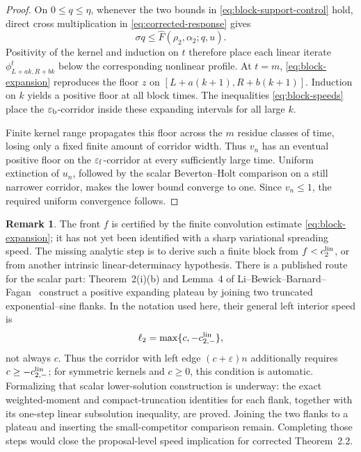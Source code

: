 \documentclass[11pt]{article}
\theoremstyle{definition}
\newtheorem{remark}[theorem]{Remark}
\newcommand{\Fhat}{\widehat F}
\begin{document}
\begin{proof}
On \(0\leq q\leq\eta\), whenever the two bounds in
\eqref{eq:block-support-control} hold, direct cross multiplication in
\eqref{eq:corrected-response} gives
\[
  \sigma q\leq\Fhat(\rho_2,\alpha_2;q,u).
\]
Positivity of the kernel and induction on \(t\) therefore place each linear
iterate \(\phi_{L+ak,R+bk}^{t}\) below the corresponding nonlinear profile.
At \(t=m\), \eqref{eq:block-expansion} reproduces the floor \(z\) on
\([L+a(k+1),R+b(k+1)]\).  Induction on \(k\) yields a positive floor at all
block times.  The inequalities \eqref{eq:block-speeds} place the
\(\varepsilon_{\rm b}\)-corridor inside these expanding intervals for all
large \(k\).

Finite kernel range propagates this floor across the \(m\) residue classes
of time, losing only a fixed finite amount of corridor width.  Thus \(v_n\)
has an eventual positive floor on the
\(\varepsilon_{\rm f}\)-corridor at every sufficiently large time.
Uniform extinction of \(u_n\), followed by the scalar Beverton--Holt
comparison on a still narrower corridor, makes the lower bound converge to
one.  Since \(v_n\leq1\), the required uniform convergence follows.
\end{proof}

\begin{remark}
The front \(f\) is certified by the finite convolution estimate
\eqref{eq:block-expansion}; it has not yet been identified with a sharp
variational spreading speed.  The missing analytic step is to derive such a
finite block from \(f<c_2^{\rm lin}\), or from another intrinsic
linear-determinacy hypothesis.  There is a published route for the scalar
part: Theorem~2(i)(b) and Lemma~4 of
Li--Bewick--Barnard--Fagan~\cite{LiBewickBarnardFagan2016} construct a
positive expanding plateau by joining two truncated exponential--sine
flanks.  In the notation used here, their general left interior speed is
\[
  \ell_2=\max\{c,-c_{2,-}^{\rm lin}\},
\]
not always \(c\).  Thus the corridor with left edge
\((c+\varepsilon)n\) additionally requires
\(c\geq-c_{2,-}^{\rm lin}\); for symmetric kernels and \(c\geq0\), this
condition is automatic.  Formalizing that scalar lower-solution construction
is underway: the exact weighted-moment and compact-truncation identities for
each flank, together with its one-step linear subsolution inequality, are
proved.  Joining the two flanks to a plateau and inserting the
small-competitor comparison remain.  Completing those steps would close the
proposal-level speed implication for corrected Theorem~2.2.
\end{remark}
\end{document}
